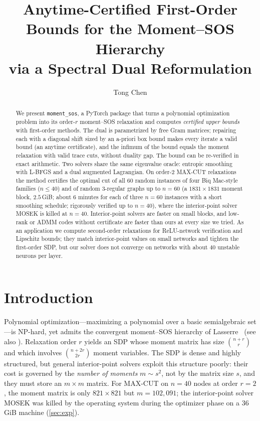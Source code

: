 \documentclass[a4paper,11pt]{article}
\title{Anytime-Certified First-Order Bounds for the Moment--SOS Hierarchy\\ via a Spectral Dual Reformulation}
\author{Tong Chen}
\date{}
\theoremstyle{plain}
\theoremstyle{definition}
\theoremstyle{remark}
\begin{document}
\maketitle

\begin{abstract}
We present \texttt{moment\_sos}, a PyTorch package that turns a polynomial optimization problem into its order-$r$ moment--SOS relaxation and computes \emph{certified upper bounds} with first-order methods. The dual is parametrized by free Gram matrices; repairing each with a diagonal shift sized by an a-priori box bound makes every iterate a valid bound (an anytime certificate), and the infimum of the bound equals the moment relaxation with valid trace cuts, without duality gap. The bound can be re-verified in exact arithmetic. Two solvers share the same eigenvalue oracle: entropic smoothing with L-BFGS and a dual augmented Lagrangian. On order-$2$ MAX-CUT relaxations the method certifies the optimal cut of all $60$ random instances of four Biq Mac-style families ($n\le40$) and of random $3$-regular graphs up to $n=60$ (a $1831\times1831$ moment block, $2.5$\,GiB; about $6$ minutes for each of three $n=60$ instances with a short smoothing schedule; rigorously verified up to $n=40$), where the interior-point solver MOSEK is killed at $n=40$. Interior-point solvers are faster on small blocks, and low-rank or ADMM codes without certificate are faster than ours at every size we tried. As an application we compute second-order relaxations for ReLU-network verification and Lipschitz bounds; they match interior-point values on small networks and tighten the first-order SDP, but our solver does not converge on networks with about $40$ unstable neurons per layer.
\end{abstract}

\section{Introduction}\label{sec:intro}
Polynomial optimization---maximizing a polynomial over a basic semialgebraic set---is NP-hard, yet admits the convergent moment--SOS hierarchy of Lasserre~\cite{lasserre2001} (see also \cite{parrilo2003,laurent2009,nie2023}). Relaxation order $r$ yields an SDP whose moment matrix has size $\binom{n+r}{r}$ and which involves $\binom{n+2r}{2r}$ moment variables. The SDP is dense and highly structured, but general interior-point solvers exploit this structure poorly: their cost is governed by the \emph{number of moments} $m\sim s^2$, not by the matrix size $s$, and they must store an $m\times m$ matrix. For MAX-CUT on $n=40$ nodes at order $r=2$, the moment matrix is only $821\times 821$ but $m=102{,}091$; the interior-point solver MOSEK was killed by the operating system during the optimizer phase on a 36\,GiB machine (\cref{sec:exp}).
\end{document}
